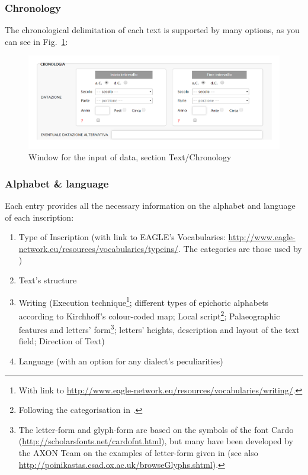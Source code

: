 \documentclass[amsthm,ebook]{saparticle}
\begin{document}
\subsubsection{Chronology}


\noindent The chronological delimitation of each text is supported by many options, as you can see in Fig.~\ref{fig:1}:

\begin{figure}[!hbp]
\centering
 \includegraphics[width=\columnwidth]{Fig1.png}
\caption{Window for the input of data, section Text/Chronology}
\label{fig:1}
\end{figure}




\subsubsection{Alphabet \& language}





\noindent Each entry provides all the necessary information on the alphabet and language of each inscription:

\begin{enumerate}
\renewcommand{\theenumi}{\alph{enumi}}
\item Type of Inscription (with link to EAGLE’s Vocabularies:
\url{http://www.eagle-network.eu/resources/vocabularies/typeins/}. The categories are those used by \citet{Guarducci:1967aa})
\item Text’s structure
\item Writing (Execution technique\footnote{ With link to \url{http://www.eagle-network.eu/resources/vocabularies/writing/}.};
different types of epichoric alphabets according to Kirchhoff’s colour-coded map; Local script\footnote{ Following the
categorisation in \citet{jeffery_local_1990}.}; Palaeographic features and letters’ form\footnote{ The letter-form and glyph-form are
based on the symbols of the font Cardo (\url{http://scholarsfonts.net/cardofnt.html}), but many have been developed by the
AXON Team on the examples of letter-form given in \citealp{jeffery_local_1990} (see also
\url{http://poinikastas.csad.ox.ac.uk/browseGlyphs.shtml}).}; letters’ heights, description and layout of the text field;
Direction of Text)
\item Language (with an option for any dialect’s peculiarities)
\end{enumerate}
\end{document}
